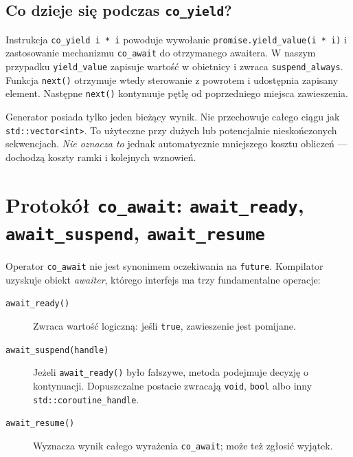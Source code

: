 \subsection{Co dzieje się podczas \texttt{co\_yield}?}

Instrukcja \texttt{co\_yield i * i} powoduje wywołanie
\texttt{promise.yield\_value(i * i)} i zastosowanie mechanizmu
\texttt{co\_await} do otrzymanego awaitera. W naszym przypadku
\texttt{yield\_value} zapisuje wartość w obietnicy i zwraca
\texttt{suspend\_always}. Funkcja \texttt{next()} otrzymuje wtedy
sterowanie z powrotem i udostępnia zapisany element. Następne
\texttt{next()} kontynuuje pętlę od poprzedniego miejsca zawieszenia.

Generator posiada tylko jeden bieżący wynik. Nie przechowuje
całego ciągu jak \texttt{std::vector<int>}. To użyteczne przy dużych
lub potencjalnie nieskończonych sekwencjach. \emph{Nie oznacza to}
jednak automatycznie mniejszego kosztu obliczeń --- dochodzą koszty
ramki i kolejnych wznowień.


\section{Protokół \texttt{co\_await}: \texttt{await\_ready},
\texttt{await\_suspend}, \texttt{await\_resume}}
\label{sec:cpp15-awaiter}

Operator \texttt{co\_await} nie jest synonimem oczekiwania na
\texttt{future}. Kompilator uzyskuje obiekt \emph{awaiter}, którego
interfejs ma trzy fundamentalne operacje:
\begin{description}
\item[\texttt{await\_ready()}] Zwraca wartość logiczną: jeśli
      \texttt{true}, zawieszenie jest pomijane.
\item[\texttt{await\_suspend(handle)}] Jeżeli \texttt{await\_ready()}
      było fałszywe, metoda podejmuje decyzję o kontynuacji.
      Dopuszczalne postacie zwracają \texttt{void}, \texttt{bool}
      albo inny \texttt{std::coroutine\_handle}.
\item[\texttt{await\_resume()}] Wyznacza wynik całego wyrażenia
      \texttt{co\_await}; może też zgłosić wyjątek.
\end{description}


